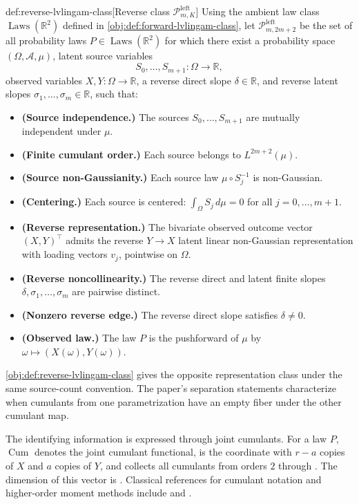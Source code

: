 \begin{definitionv}{def:reverse-lvlingam-class}[Reverse class \(\mathcal P^{\mathrm{left}}_{m,K}\)]
Using the ambient law class \(\operatorname{Laws}(\mathbb R^2)\) defined in \cref{obj:def:forward-lvlingam-class}, let \(\mathcal P^{\mathrm{left}}_{m,2m+2}\) be the set of all probability laws \(P\in \operatorname{Laws}(\mathbb R^2)\) for which there exist a probability space \((\Omega,\mathcal A,\mu)\), latent source variables
\[
S_0,\ldots,S_{m+1}:\Omega\to\mathbb R,
\]
observed variables \(X,Y:\Omega\to\mathbb R\), a reverse direct slope \(\delta\in\mathbb R\), and reverse latent slopes \(\sigma_1,\ldots,\sigma_m\in\mathbb R\), such that:
\begin{itemize}
\item \textbf{(Source independence.)} The sources \(S_0,\ldots,S_{m+1}\) are mutually independent under \(\mu\).
\item \textbf{(Finite cumulant order.)} Each source belongs to \(L^{2m+2}(\mu)\).
\item \textbf{(Source non-Gaussianity.)} Each source law \(\mu\circ S_j^{-1}\) is non-Gaussian.
\item \textbf{(Centering.)} Each source is centered: \(\int_\Omega S_j\,d\mu=0\) for all \(j=0,\ldots,m+1\).
\item \textbf{(Reverse representation.)} The bivariate observed outcome vector \((X,Y)^\top\) admits the reverse \(Y\to X\) latent linear non-Gaussian representation with loading vectors \(v_j\), pointwise on \(\Omega\).
\item \textbf{(Reverse noncollinearity.)} The reverse direct and latent finite slopes \(\delta,\sigma_1,\ldots,\sigma_m\) are pairwise distinct.
\item \textbf{(Nonzero reverse edge.)} The reverse direct slope satisfies \(\delta\ne 0\).
\item \textbf{(Observed law.)} The law \(P\) is the pushforward of \(\mu\) by \(\omega\mapsto (X(\omega),Y(\omega))\).
\end{itemize}
\end{definitionv}

\cref{obj:def:reverse-lvlingam-class} gives the opposite representation class under the same source-count convention. The paper's separation statements characterize when cumulants from one parametrization have an empty fiber under the other cumulant map.

The identifying information is expressed through joint cumulants. For a law \(P\), \(\operatorname{Cum}\) denotes the joint cumulant functional,  is the coordinate with \(r-a\) copies of \(X\) and \(a\) copies of \(Y\), and  collects all cumulants from orders \(2\) through . The dimension of this vector is . Classical references for cumulant notation and higher-order moment methods include \citet{Brillinger1969} and \citet{McCullagh1987}.


